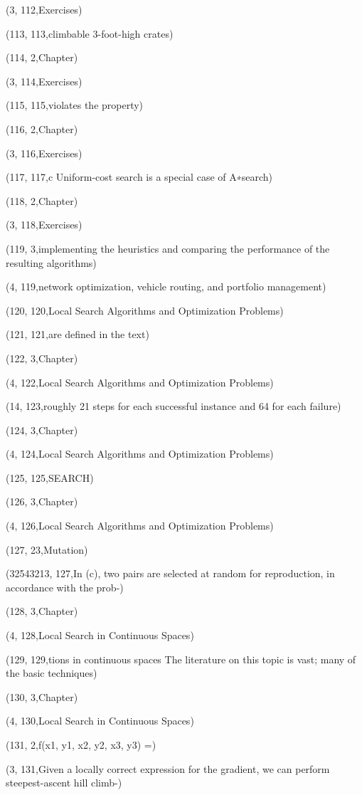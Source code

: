 (3, 112,Exercises)

(113, 113,climbable 3-foot-high crates)

(114, 2,Chapter)

(3, 114,Exercises)

(115, 115,violates the property)

(116, 2,Chapter)

(3, 116,Exercises)

(117, 117,c Uniform-cost search is a special case of A∗search)

(118, 2,Chapter)

(3, 118,Exercises)

(119, 3,implementing the heuristics and comparing the performance of the resulting algorithms)

(4, 119,network optimization, vehicle routing, and portfolio management)

(120, 120,Local Search Algorithms and Optimization Problems)

(121, 121,are deﬁned in the text)

(122, 3,Chapter)

(4, 122,Local Search Algorithms and Optimization Problems)

(14, 123,roughly 21 steps for each successful instance and 64 for each failure)

(124, 3,Chapter)

(4, 124,Local Search Algorithms and Optimization Problems)

(125, 125,SEARCH)

(126, 3,Chapter)

(4, 126,Local Search Algorithms and Optimization Problems)

(127, 23,Mutation)

(32543213, 127,In (c), two pairs are selected at random for reproduction, in accordance with the prob-)

(128, 3,Chapter)

(4, 128,Local Search in Continuous Spaces)

(129, 129,tions in continuous spaces The literature on this topic is vast; many of the basic techniques)

(130, 3,Chapter)

(4, 130,Local Search in Continuous Spaces)

(131, 2,f(x1, y1, x2, y2, x3, y3) =)

(3, 131,Given a locally correct expression for the gradient, we can perform steepest-ascent hill climb-)

